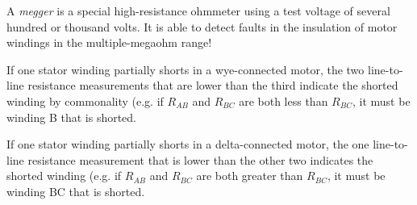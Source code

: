 





A {\it megger} is a special high-resistance ohmmeter using a test voltage of several hundred or thousand volts.  It is able to detect faults in the insulation of motor windings in the multiple-megaohm range!

\vskip 10pt

If one stator winding partially shorts in a wye-connected motor, the two line-to-line resistance measurements that are lower than the third indicate the shorted winding by commonality (e.g. if $R_{AB}$ and $R_{BC}$ are both less than $R_{BC}$, it must be winding B that is shorted.

\vskip 10pt

If one stator winding partially shorts in a delta-connected motor, the one line-to-line resistance measurement that is lower than the other two indicates the shorted winding (e.g. if $R_{AB}$ and $R_{BC}$ are both greater than $R_{BC}$, it must be winding BC that is shorted.










